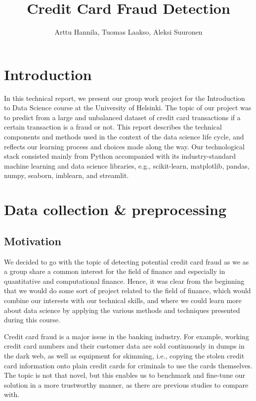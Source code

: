 \documentclass{article}
\title{Credit Card Fraud Detection}
\author{Arttu Hannila, Tuomas Laakso, Aleksi Suuronen}
\begin{document}
\maketitle

\section{Introduction}

In this technical report, we present our group work project for the Introduction to Data Science course at the University of Helsinki. The topic of our project was to predict from a large and unbalanced dataset of credit card transactions if a certain transaction is a fraud or not. This report describes the technical components and methods used in the context of the data science life cycle, and reflects our learning process and choices made along the way. Our technological stack consisted mainly from Python accompanied with its industry-standard machine learning and data science libraries, e.g., scikit-learn, matplotlib, pandas, numpy, seaborn, imblearn, and streamlit.

\section{Data collection \& preprocessing}

\subsection{Motivation}

We decided to go with the topic of detecting potential credit card fraud as we as a group share a common interest for the field of finance and especially in quantitative and computational finance. Hence, it was clear from the beginning that we would do some sort of project related to the field of finance, which would combine our interests with our technical skills, and where we could learn more about data science by applying the various methods and techniques presented during this course.

Credit card fraud is a major issue in the banking industry. For example, working credit card numbers and their customer data are sold continuously in dumps in the dark web, as well as equipment for skimming, i.e., copying the stolen credit card information onto plain credit cards for criminals to use the cards themselves. The topic is not that novel, but this enables us to benchmark and fine-tune our solution in a more trustworthy manner, as there are previous studies to compare with.
\end{document}
